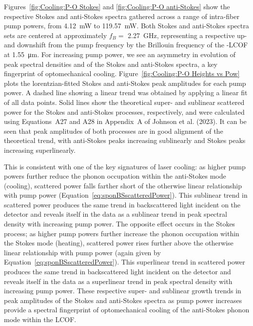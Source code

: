 Figures~\ref{fig:Cooling:P-O Stokes} and \ref{fig:Cooling:P-O anti-Stokes} show the respective Stokes and anti-Stokes spectra gathered across a range of intra-fiber pump powers, from \SI{4.12}{\milli\watt} to \SI{119.57}{\milli\watt}. Both Stokes and anti-Stokes spectra sets are centered at approximately \(f_{B} = \) \SI{2.27}{\giga\hertz}, representing a respective up- and downshift from the pump frequency by the Brillouin frequency of the -\ac{LCOF} at \SI{1.55}{\micro\meter}. For increasing pump power, we see an asymmetry in evolution of peak spectral densities and of the Stokes and anti-Stokes spectra, a key fingerprint of optomechanical cooling. Figure~\ref{fig:Cooling:P-O Heights vs Pow} plots the lorentzian-fitted Stokes and anti-Stokes peak amplitudes for each pump power. A dashed line showing a linear trend was obtained by applying a linear fit of all data points. Solid lines show the theoretical super- and sublinear scattered power for the Stokes and anti-Stokes processes, respectively, and were calculated using Equations~A27 and A28 in Appendix~A of Johnson et al. (2023)\cite{johnson2023laser}. It can be seen that peak amplitudes of both processes are in good alignment of the theoretical trend, with anti-Stokes peaks increasing sublinearly and Stokes peaks increasing superlinearly.

This is consistent with one of the key signatures of laser cooling: as higher pump powers further reduce the phonon occupation within the anti-Stokes mode (cooling), scattered power falls farther short of the otherwise linear relationship with pump power (Equation~\ref{eq:sponBSscatteredPower}). This sublinear trend in scattered power produces the same trend in backscattered light incident on the detector and reveals itself in the data as a sublinear trend in peak spectral density with increasing pump power. The opposite effect occurs in the Stokes process; as higher pump powers further increase the phonon occupation within the Stokes mode (heating), scattered power rises further above the otherwise linear relationship with pump power (again given by Equation~\ref{eq:sponBSscatteredPower}). This superlinear trend in scattered power produces the same trend in backscattered light incident on the detector and reveals itself in the data as a superlinear trend in peak spectral density with increasing pump power. These respective super- and sublinear growth trends in peak amplitudes of the Stokes and anti-Stokes spectra as pump power increases provide a spectral fingerprint of optomechanical cooling of the anti-Stokes phonon mode within the \ac{LCOF}.

